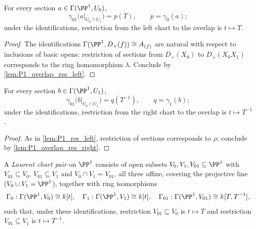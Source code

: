 \begin{lemma}
  \label{lem:P1_res_left}
  \leanok
  For every section \(a \in \Gamma(\PP^1, U_0)\),
  \[
    \gamma_{01}\bigl(a|_{U_0 \cap U_1}\bigr) = p(T), \qquad p = \gamma_0(a);
  \]
  under the identifications, restriction from the left chart to the overlap is
  \(t \mapsto T\).
\end{lemma}
\begin{proof}
  \leanok
  The identifications \(\Gamma(\PP^1, D_+(f)) \cong A_{(f)}\) are natural with respect to
  inclusions of basic opens: restriction of sections from \(D_+(X_0)\) to \(D_+(X_0X_1)\)
  corresponds to the ring homomorphism \(\lambda\). Conclude by
  \ref{lem:P1_overlap_res_left}.
\end{proof}

\begin{lemma}
  \label{lem:P1_res_right}
  \leanok
  For every section \(b \in \Gamma(\PP^1, U_1)\),
  \[
    \gamma_{01}\bigl(b|_{U_0 \cap U_1}\bigr) = q(T^{-1}), \qquad q = \gamma_1(b);
  \]
  under the identifications, restriction from the right chart to the overlap is
  \(t \mapsto T^{-1}\).
\end{lemma}
\begin{proof}
  \leanok
  As in \ref{lem:P1_res_left}, restriction of sections corresponds to \(\rho\); conclude by
  \ref{lem:P1_overlap_res_right}.
\end{proof}

\begin{definition}
  \label{def:LaurentChartPair}
  \leanok
  A \emph{Laurent chart pair} on \(\PP^1\) consists of open subsets
  \(V_0, V_1, V_{01} \subseteq \PP^1\) with \(V_{01} \subseteq V_0\),
  \(V_{01} \subseteq V_1\) and \(V_0 \cap V_1 = V_{01}\), all three affine, covering the
  projective line (\(V_0 \cup V_1 = \PP^1\)), together with ring isomorphisms
  \[
    \Gamma_0 : \Gamma(\PP^1, V_0) \cong k[t], \quad
    \Gamma_1 : \Gamma(\PP^1, V_1) \cong k[t], \quad
    \Gamma_{01} : \Gamma(\PP^1, V_{01}) \cong k[T, T^{-1}],
  \]
  such that, under these identifications, restriction \(V_{01} \subseteq V_0\) is
  \(t \mapsto T\) and restriction \(V_{01} \subseteq V_1\) is \(t \mapsto T^{-1}\).
\end{definition}

